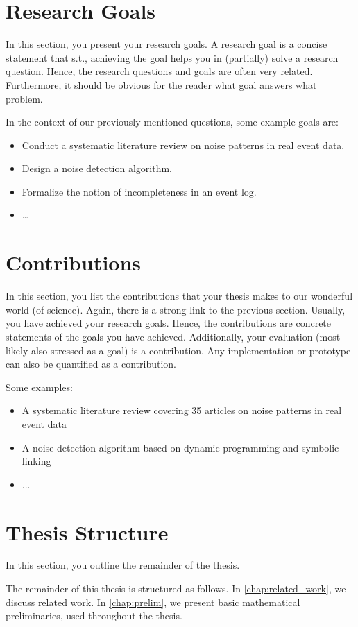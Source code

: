 \section{Research Goals}

In this section, you present your research goals.
A research goal is a concise statement that s.t., achieving the goal helps you in (partially) solve a research question.
Hence, the research questions and goals are often very related.
Furthermore, it should be obvious for the reader what goal answers what problem.

In the context of our previously mentioned questions, some example goals are:
\begin{itemize}
	\item Conduct a systematic literature review on noise patterns in real event data.
	\item Design a noise detection algorithm.
	\item Formalize the notion of incompleteness in an event log.
	\item \dots
\end{itemize}

\section{Contributions}

In this section, you list the contributions that your thesis makes to our wonderful world (of science).
Again, there is a strong link to the previous section.
Usually, you have achieved your research goals.
Hence, the contributions are concrete statements of the goals you have achieved.
Additionally, your evaluation (most likely also stressed as a goal) is a contribution.
Any implementation or prototype can also be quantified as a contribution.

Some examples:
\begin{itemize}
	\item A systematic literature review covering 35 articles on noise patterns in real event data
	\item A noise detection algorithm based on dynamic programming and symbolic linking
	\item ...
\end{itemize}

\section{Thesis Structure}
In this section, you outline the remainder of the thesis.

The remainder of this thesis is structured as follows.
In \cref{chap:related_work}, we discuss related work.
In \cref{chap:prelim}, we present basic mathematical preliminaries, used throughout the thesis.
